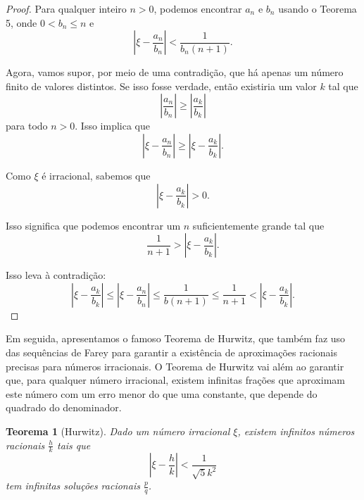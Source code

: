 \documentclass{hipatia}
\newtheorem*{theorem*}{Teorema}
\theoremstyle{definition} %
\begin{document}
\begin{proof}
Para qualquer inteiro \( n > 0 \), podemos encontrar \( a_n \) e \( b_n \) usando o Teorema 5, onde \( 0 < b_n \leq n \) e
\[
\left| \xi - \frac{a_n}{b_n} \right| < \frac{1}{b_n(n + 1)}.
\]

Agora, vamos supor, por meio de uma contradição, que há apenas um número finito de valores distintos. Se isso fosse verdade, então existiria um valor \( k \) tal que
\[
\left| \frac{a_n}{b_n} \right| \geq \left| \frac{a_k}{b_k} \right|
\]
para todo \( n > 0 \). Isso implica que
\[
\left| \xi - \frac{a_n}{b_n} \right| \geq \left| \xi - \frac{a_k}{b_k} \right|.
\]

Como \( \xi \) é irracional, sabemos que
\[
\left| \xi - \frac{a_k}{b_k} \right| > 0.
\]

Isso significa que podemos encontrar um \( n \) suficientemente grande tal que
\[
\frac{1}{n + 1} > \left| \xi - \frac{a_k}{b_k} \right|.
\]

Isso leva à contradição:
\[
\left| \xi - \frac{a_k}{b_k} \right| \leq \left| \xi - \frac{a_n}{b_n} \right| \leq \frac{1}{b(n+1)} \leq \frac{1}{n+1} < \left| \xi - \frac{a_k}{b_k} \right|.
\]
\end{proof}

Em seguida, apresentamos o famoso Teorema de Hurwitz, que também faz uso das sequências de Farey para garantir a existência de aproximações racionais precisas para números irracionais. O Teorema de Hurwitz vai além ao garantir que, para qualquer número irracional, existem infinitas frações que aproximam este número com um erro menor do que uma constante, que depende do quadrado do denominador. 

\begin{theorem*} [Hurwitz]
Dado um número irracional \(\xi\), existem infinitos números racionais \(\frac{h}{k}\) tais que
\[
\left| \xi - \frac{h}{k} \right| < \frac{1}{\sqrt{5}k^2}
\]
tem infinitas soluções racionais \(\frac{p}{q}\).
\end{theorem*}
\end{document}
